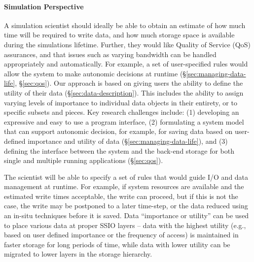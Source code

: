 \paragraph{Simulation Perspective}
\label{subsec:sim-perspective}
A simulation scientist should ideally be able to
obtain an estimate of how much time will be required to write data,
and how much storage space is available during the simulations lifetime.
Further, they would like Quality of Service (QoS) assurances, and that
issues such as varying bandwidth can be handled appropriately and 
automatically. For example, a set of user-specified rules would allow 
the system to make autonomic decisions at runtime
(\S\ref{sec:managing-data-life}, \S\ref{sec:qos}).
%
Our approach is based on giving users the ability to define the utility of
their data (\S\ref{sec:data-description}). This includes the ability to assign
varying levels of importance to individual data objects in their entirety,
or to specific subsets and pieces. Key research challenges include: (1)
developing an expressive and easy to use a program interface, (2) formulating
a system model that can support autonomic decision, for example, for saving
data based on user-defined importance and utility of
data (\S\ref{sec:managing-data-life}), and (3) defining the interface between
the system and the back-end storage for both single and multiple running
applications (\S\ref{sec:qos}).

The scientist will be able to specify a set of rules that
would guide I/O and data management at runtime. For example, if system
resources are available and the estimated write times acceptable, the write
can proceed, but if this is not the case, the write may be postponed to a
later time-step, or the data reduced using an in-situ techniques before it
is saved. Data ``importance or utility'' can be used to place various data
at proper SSIO layers -- data with the highest utility (e.g., based on user
defined importance or the frequency of access) is maintained in faster
storage for long periods of time, while data with lower utility can be
migrated to lower layers in the storage hierarchy.

%

